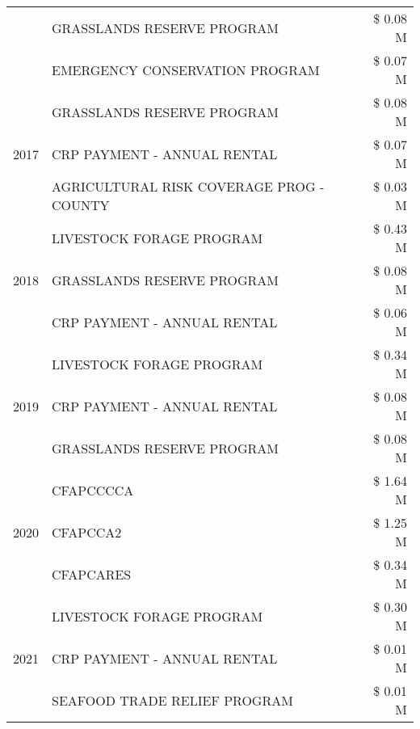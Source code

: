 \begin{tabular}{llr}
 & GRASSLANDS RESERVE PROGRAM & \$ 0.08 M \\
 & EMERGENCY CONSERVATION PROGRAM & \$ 0.07 M \\
\cline{1-3}
\multirow[t]{3}{*}{2017} & GRASSLANDS RESERVE PROGRAM & \$ 0.08 M \\
 & CRP PAYMENT - ANNUAL RENTAL & \$ 0.07 M \\
 & AGRICULTURAL RISK COVERAGE PROG - COUNTY & \$ 0.03 M \\
\cline{1-3}
\multirow[t]{3}{*}{2018} & LIVESTOCK FORAGE PROGRAM & \$ 0.43 M \\
 & GRASSLANDS RESERVE PROGRAM & \$ 0.08 M \\
 & CRP PAYMENT - ANNUAL RENTAL & \$ 0.06 M \\
\cline{1-3}
\multirow[t]{3}{*}{2019} & LIVESTOCK FORAGE PROGRAM & \$ 0.34 M \\
 & CRP PAYMENT - ANNUAL RENTAL & \$ 0.08 M \\
 & GRASSLANDS RESERVE PROGRAM & \$ 0.08 M \\
\cline{1-3}
\multirow[t]{3}{*}{2020} & CFAPCCCCA & \$ 1.64 M \\
 & CFAPCCA2 & \$ 1.25 M \\
 & CFAPCARES & \$ 0.34 M \\
\cline{1-3}
\multirow[t]{3}{*}{2021} & LIVESTOCK FORAGE PROGRAM & \$ 0.30 M \\
 & CRP PAYMENT - ANNUAL RENTAL & \$ 0.01 M \\
 & SEAFOOD TRADE RELIEF PROGRAM & \$ 0.01 M \\
\cline{1-3}
\bottomrule
\end{tabular}
